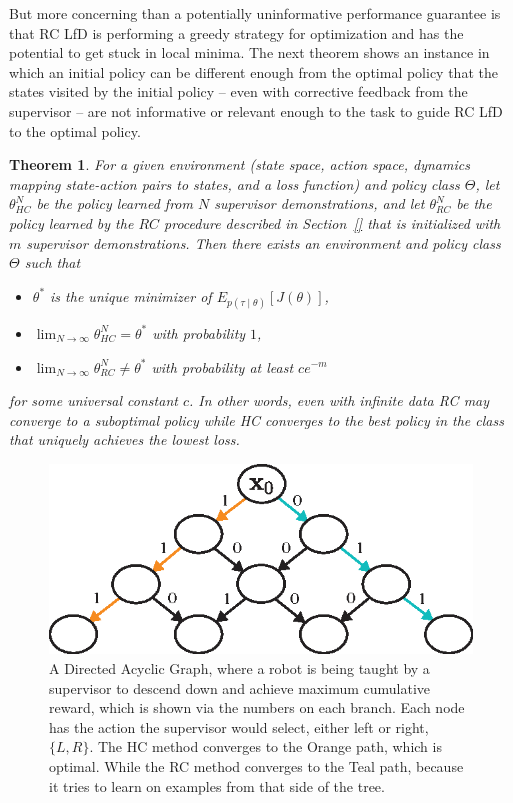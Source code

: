 \documentclass[10pt, conference]{ieeeconf}      %
\newtheorem{theorem}{Theorem}[section]
\begin{document}
But more concerning than a potentially uninformative performance guarantee is that RC LfD is performing a greedy strategy for optimization and has the potential to get stuck in local minima.
The next theorem shows an instance in which an initial policy can be different enough from the optimal policy that the states visited by the initial policy -- even with corrective feedback from the supervisor --  are not informative or relevant enough to the task to guide RC LfD to the optimal policy. 

\begin{theorem}
For a given environment (state space, action space, dynamics mapping state-action pairs to states, and a loss function) and policy class $\Theta$,
let $\theta_{HC}^N$ be the policy learned from $N$ supervisor demonstrations,
and let $\theta_{RC}^N$ be the policy learned by the $RC$ procedure described in Section~\ref{} that is initialized with $m$ supervisor demonstrations.  
Then there exists an environment and policy class $\Theta$ such that 
\begin{itemize}
\item $\theta^*$ is the unique minimizer of $E_{p(\tau \mid \theta)}[ J( \theta ) ]$,
\item $\lim_{N \rightarrow \infty} \theta_{HC}^N = \theta^*$ with probability $1$,
\item $\lim_{N \rightarrow \infty} \theta_{RC}^N \neq \theta^*$ with probability at least $c e^{-m}$
\end{itemize}
for some universal constant $c$.
In other words, even with infinite data RC may converge to a suboptimal policy while HC converges to the best policy in the class that uniquely achieves the lowest loss.
\end{theorem}

\begin{figure}
\centering
\includegraphics{f_figs/counter_exmp.eps}
\caption{
    \footnotesize
A Directed Acyclic Graph, where a robot is being taught by a supervisor to descend down and achieve maximum cumulative reward, which is shown via the numbers on each branch. Each node has the action the supervisor would select, either left or right, $\lbrace L, R \rbrace$. The HC method converges to the Orange path, which is optimal. While the RC method converges to the Teal path, because it tries to learn on examples from that side of the tree.}
\vspace*{-20pt}
\label{fig:c_ex}
\end{figure}
\end{document}
